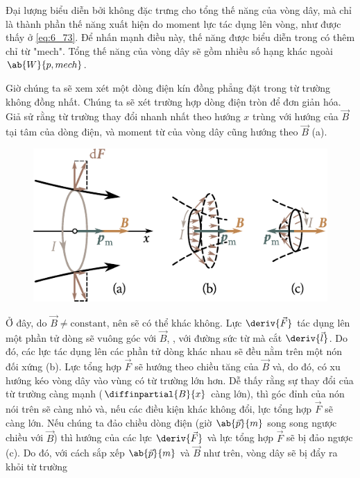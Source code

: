 Đại lượng biểu diễn bởi  không đặc trưng cho tổng thế năng của vòng dây, mà chỉ là thành phần thế năng xuất hiện do moment lực tác dụng lên vòng, như được thấy ở \eqref{eq:6_73}. Để nhấn mạnh điều này, thế năng được biểu diễn trong  có thêm chỉ từ "mech". Tổng thế năng của vòng dây sẽ gồm nhiều số hạng khác ngoài $\ab{W}{p,mech}$.

Giờ chúng ta sẽ xem xét một dòng điện kín đồng phẳng đặt trong từ trường không đồng nhất. Chúng ta sẽ xét trường hợp dòng điện tròn để đơn giản hóa. Giả sử rằng từ trường thay đổi nhanh nhất theo hướng $x$ trùng với hướng của $\vec{B}$ tại tâm của dòng điện, và moment từ của vòng dây cũng hướng theo $\vec{B}$ (a).

\begin{figure}[t]
	\begin{center}
		\includegraphics[scale=1]{figures/ch_06/fig_6_17.pdf}
		\caption[]{}
		\label{fig:6_17}
	\end{center}
	\vspace{-0.8cm}
\end{figure}

Ở đây, do $\vec{B}\neq\text{constant}$, nên  sẽ có thể khác không. Lực $\deriv{\vec{F}}$ tác dụng lên một phần tử dòng sẽ vuông góc với $\vec{B}$, \ie, với đường sức từ mà cắt $\deriv{\vec{l}}$. Do đó, các lực tác dụng lên các phần tử dòng khác nhau sẽ đều nằm trên một nón đối xứng (b). Lực tổng hợp $\vec{F}$ sẽ hướng theo chiều tăng của $\vec{B}$ và, do đó, có xu hướng kéo vòng dây vào vùng có từ trường lớn hơn. Dễ thấy rằng sự thay đổi của từ trường càng mạnh ($\diffinpartial{B}{x}$ càng lớn), thì góc đỉnh của nón nói trên sẽ càng nhỏ và, nếu các điều kiện khác không đổi, lực tổng hợp $\vec{F}$ sẽ càng lớn.
Nếu chúng ta đảo chiều dòng điện (giờ $\ab{\vec{p}}{m}$ song song ngược chiều với $\vec{B}$) thì hướng của các lực $\deriv{\vec{F}}$ và lực tổng hợp $\vec{F}$ sẽ bị đảo ngược (c). Do đó, với cách sắp xếp $\ab{\vec{p}}{m}$ và $\vec{B}$ như trên, vòng dây sẽ bị đẩy ra khỏi từ trường

